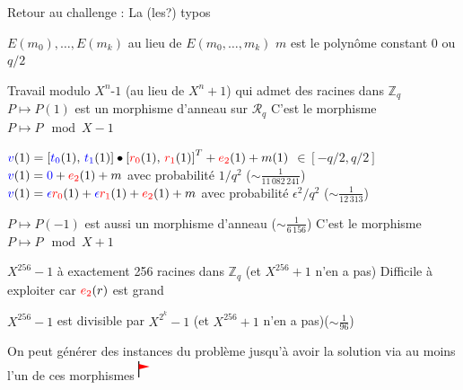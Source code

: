 \begin{frame}{Retour au challenge : La (les?) typos}
    \begin{outline}
        \1 $E(m_0),\dots,E(m_k)$ au lieu de $E(m_0,\dots,m_k)$
            \2 $m$ est le polynôme constant 0 ou $q/2$

        \vspace{0.2cm}
        \pause
        
        \1 Travail modulo $X^n\textbf{-}1$ (au lieu de $X^n+1$) qui admet des racines dans $\mathbb{Z}_q$ 
        \pause
            \2 $P\mapsto P(1)$ est un morphisme d'anneau sur $\mathcal{R}_q$ %
	    	\3 C'est le morphisme $P \mapsto P \mod X-1$

            \vspace{0.1cm}
            \pause
            
            \2  $\textcolor{blue}{v}(1) = \left[\textcolor{blue}{t_0}(1),\,\textcolor{blue}{t_1}(1)\right]\bullet \left[\textcolor{red}{r_0}(1),\,\textcolor{red}{r_1}(1)\right]^{T}+\textcolor{red}{e_2}(1) + m(1)$ \pause $\in[-q/2,q/2]$ 
            \pause
                \3 $\textcolor{blue}{v}(1) = \textcolor{blue}{0}+\textcolor{red}{e_2}(1) + m$  avec probabilité $1/q^2$ \hfill ($\sim\frac{1}{11\,082\,241}$)
                \pause
                \3 $\textcolor{blue}{v}(1) = \textcolor{blue}{\epsilon}\textcolor{red}{r_0}(1)+\textcolor{blue}{\epsilon}\textcolor{red}{r_1}(1)+\textcolor{red}{e_2}(1) + m$  avec probabilité $\epsilon^2/q^2$ \hfill ($\sim\frac{1}{12\,313}$)
                \pause

            \vspace{0.1cm}
            \pause
            
            \2 $P\mapsto P(-1)$ est aussi un morphisme d'anneau \hfill ($\sim\frac{1}{6\,156}$)
	    	\3 C'est le morphisme $P \mapsto P \mod X+1$

            \vspace{0.1cm}
            \pause
            
            \2 $X^{256}-1$ à exactement 256 racines dans $\mathbb{Z}_q$ (et $X^{256}+1$ n'en a pas)
		\3 Difficile à exploiter car $\textcolor{red}{e_2}(r)$ est grand
		
		\pause
	    \2 $X^{256}-1$ est divisible par $X^{2^k}-1$  (et $X^{256}+1$ n'en a pas)\hfill ($\sim\frac{1}{96}$)
        \vspace{0.2cm}
        \pause

        \1 On peut générer des instances du problème jusqu'à avoir la solution via au moins l'un de ces morphismes $\flag$

    \end{outline}
\end{frame}
